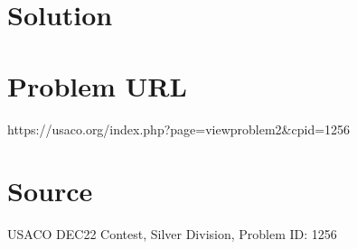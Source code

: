 \documentclass[12pt]{article}
\begin{document}
\section*{Solution}


\section*{Problem URL}
https://usaco.org/index.php?page=viewproblem2&cpid=1256

\section*{Source}
USACO DEC22 Contest, Silver Division, Problem ID: 1256
\end{document}
